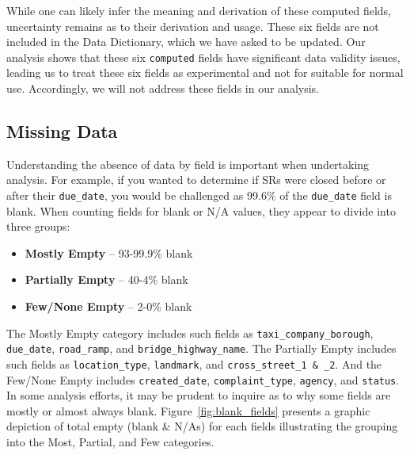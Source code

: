 \documentclass[linenumber]{jdsart}
\begin{document}
While one can likely infer the meaning and 
derivation of these computed fields, uncertainty remains as to
their derivation and usage. These six fields are not included in
the Data Dictionary, which we have asked to be updated. Our 
analysis shows that these six \texttt{computed} fields have 
significant data validity issues, leading us to treat these six fields 
as experimental and not for suitable for normal use. Accordingly, 
we will not address these fields in our analysis.


\subsection{Missing Data}
\label{sec:blanks}
Understanding the absence of data by field is important 
when undertaking analysis. For example, if you wanted to 
determine if SRs were closed before or after their
\texttt{due\_date}, you would be challenged as 99.6\% of the
\texttt{due\_date} field is blank. When counting fields for 
blank or N/A values, they appear to divide into three groups:

\begin{itemize}
    \item \textbf{Mostly Empty} -- 93-99.9\% blank 
    \item \textbf{Partially Empty} -- 40-4\% blank
    \item \textbf{Few/None Empty} -- 2-0\% blank
\end{itemize}


The Mostly Empty category includes such fields as
\texttt{taxi\_company\_borough}, \texttt{due\_date},
\texttt{road\_ramp}, and \texttt{bridge\_highway\_name}.
The Partially Empty includes such fields as
\texttt{location\_type}, \texttt{landmark}, 
and \texttt{cross\_street\_1 \& \_2}. And the Few/None Empty includes
\texttt{created\_date}, \texttt{complaint\_type},
\texttt{agency}, and \texttt{status}. In some analysis efforts, it may be
prudent to inquire as to why some fields are mostly or almost always blank.
Figure~\ref{fig:blank_fields} presents a graphic 
depiction of total empty (blank \& N/As) for each fields illustrating
the grouping into the Most, Partial, and Few categories.
\end{document}
